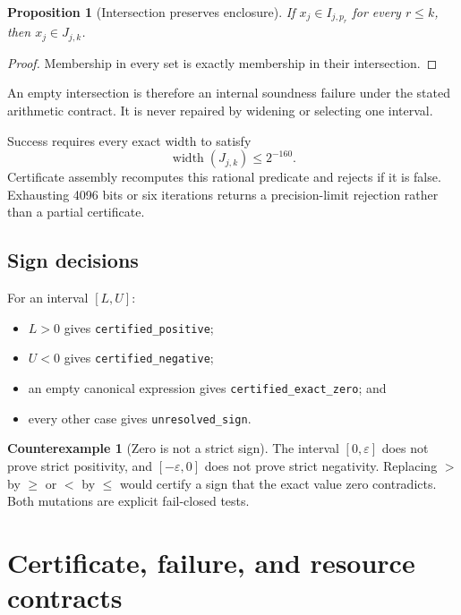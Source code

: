 \documentclass[11pt]{article}
\newtheorem{proposition}[theorem]{Proposition}
\theoremstyle{definition}
\newtheorem{counterexample}[theorem]{Counterexample}
\begin{document}
\begin{proposition}[Intersection preserves enclosure]
If $x_j\in I_{j,p_r}$ for every $r\le k$, then $x_j\in J_{j,k}$.
\end{proposition}

\begin{proof}
Membership in every set is exactly membership in their intersection.
\end{proof}

An empty intersection is therefore an internal soundness failure under the stated arithmetic
contract.  It is never repaired by widening or selecting one interval.

Success requires every exact width to satisfy
\begin{equation}
  \operatorname{width}(J_{j,k})\le 2^{-160}.
\end{equation}
Certificate assembly recomputes this rational predicate and rejects if it is false.  Exhausting
4096 bits or six iterations returns a precision-limit rejection rather than a partial
certificate.

\subsection{Sign decisions}

For an interval $[L,U]$:
\begin{itemize}[leftmargin=*]
  \item $L>0$ gives \texttt{certified\_positive};
  \item $U<0$ gives \texttt{certified\_negative};
  \item an empty canonical expression gives \texttt{certified\_exact\_zero}; and
  \item every other case gives \texttt{unresolved\_sign}.
\end{itemize}

\begin{counterexample}[Zero is not a strict sign]\label{cex:sign}
The interval $[0,\varepsilon]$ does not prove strict positivity, and
$[-\varepsilon,0]$ does not prove strict negativity.  Replacing $>$ by $\ge$ or $<$ by $\le$
would certify a sign that the exact value zero contradicts.  Both mutations are explicit
fail-closed tests.
\end{counterexample}

\section{Certificate, failure, and resource contracts}
\end{document}
